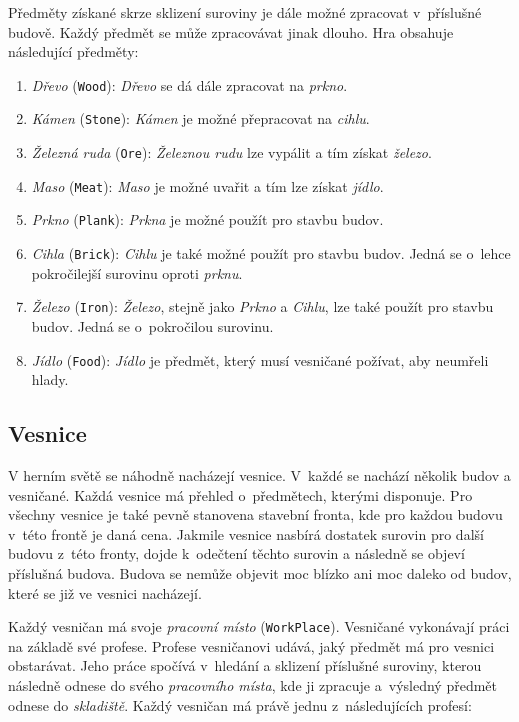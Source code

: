 Předměty získané skrze sklizení suroviny je dále možné zpracovat v~příslušné budově. Každý předmět se může zpracovávat jinak dlouho. Hra obsahuje následující předměty:

\begin{enumerate}
    \item \textit{Dřevo} (\verb|Wood|): \textit{Dřevo} se dá dále zpracovat na \textit{prkno}.
    \item \textit{Kámen} (\verb|Stone|): \textit{Kámen} je možné přepracovat na \textit{cihlu}.
    \item \textit{Železná ruda} (\verb|Ore|): \textit{Železnou rudu} lze vypálit a tím získat \textit{železo}.
    \item \textit{Maso} (\verb|Meat|): \textit{Maso} je možné uvařit a tím lze získat \textit{jídlo}.
    \item \textit{Prkno} (\verb|Plank|): \textit{Prkna} je možné použít pro stavbu budov.
    \item \textit{Cihla} (\verb|Brick|): \textit{Cihlu} je také možné použít pro stavbu budov. Jedná se o~lehce pokročilejší surovinu oproti \textit{prknu}.
    \item \textit{Železo} (\verb|Iron|): \textit{Železo}, stejně jako \textit{Prkno} a \textit{Cihlu}, lze také použít pro stavbu budov. Jedná se o~pokročilou surovinu.
    \item \textit{Jídlo} (\verb|Food|): \textit{Jídlo} je předmět, který musí vesničané požívat, aby neumřeli hlady.
\end{enumerate}

\subsection{Vesnice}
\label{subsec:villages}
V herním světě se náhodně nacházejí vesnice. V~každé se nachází několik budov a vesničané. Každá vesnice má přehled o~předmětech, kterými disponuje. Pro všechny vesnice je také pevně stanovena stavební fronta, kde pro každou budovu v~této frontě je daná cena. Jakmile vesnice nasbírá dostatek surovin pro další budovu z~této fronty, dojde k~odečtení těchto surovin a následně se objeví příslušná budova. Budova se nemůže objevit moc blízko ani moc daleko od budov, které se již ve vesnici nacházejí.

Každý vesničan má svoje \textit{pracovní místo} (\verb|WorkPlace|). Vesničané vykonávají práci na základě své profese. Profese vesničanovi udává, jaký předmět má pro vesnici obstarávat. Jeho práce spočívá v~hledání a sklizení příslušné suroviny, kterou následně odnese do svého \textit{pracovního místa}, kde ji zpracuje a~výsledný předmět odnese do \textit{skladiště}. Každý vesničan má právě jednu z~následujících profesí:

